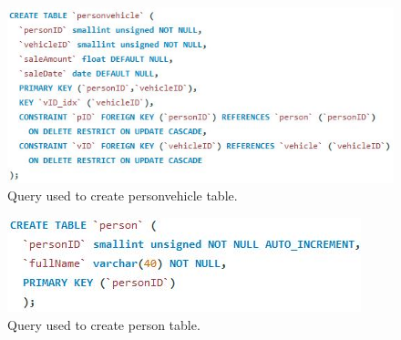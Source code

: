 \documentclass[12pt,letterpaper]{article}
\begin{document}
	\pagebreak
	\begin{figure}[ht]  
		\begin{center}
			\includegraphics[width=\textwidth]{personvehicle.jpg}
		\end{center}
		\caption{\label{personvehicle} Query used to create personvehicle table.}
	\end{figure}
	\pagebreak
	\begin{figure}[ht]  
		\begin{center}
			\includegraphics[width=\textwidth]{person.jpg}
		\end{center}
		\caption{\label{person} Query used to create person table.}
	\end{figure}
\end{document}
